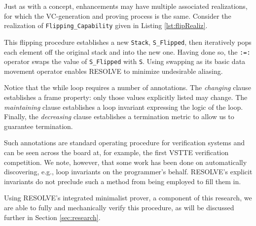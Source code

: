 Just as with a concept, enhancements may have multiple associated realizations, for which the VC-generation and proving process is the same.  Consider the realization of \texttt{Flipping\_Capability} given in Listing \ref{lst:flipRealiz}.



This flipping procedure establishes a new \texttt{Stack}, \texttt{S\_Flipped}, then iteratively pops each element off the original stack and into the new one.  Having done so, the \texttt{:=:} operator swaps the value of \texttt{S\_Flipped} with \texttt{S}.  Using swapping as its basic data movement operator enables RESOLVE to minimize undesirable aliasing\cite{harmsSwapping}.

Notice that the while loop requires a number of annotations.  The \emph{changing} clause establishes a frame property: only those values explicitly listed may change.  The \emph{maintaining} clause establishes a loop invariant expressing the logic of the loop.  Finally, the \emph{decreasing} clause establishes a termination metric to allow us to guarantee termination.

Such annotations are standard operating procedure for verification systems and can be seen across the board at, for example, the first VSTTE verification competition\cite{klebanovVSTTEExperience}.  We note, however, that some work has been done on automatically discovering, e.g., loop invariants on the programmer's behalf\cite{ernstInfer}.  RESOLVE's explicit invariants do not preclude such a method from being employed to fill them in.

Using RESOLVE's integrated minimalist prover, a component of this research, we are able to fully and mechanically verify this procedure, as will be discussed further in Section \ref{sec:research}.
